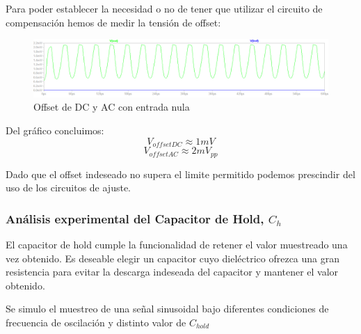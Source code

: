 Para poder establecer la necesidad o no de tener que utilizar el circuito de compensación hemos de medir la tensión de offset:
\begin{figure}[H]
	\centering
	\includegraphics[width=\linewidth]{ImagenesEjercicio4/DCACoffset}
	\caption{Offset de DC y AC con entrada nula}
	\label{fig:dcacoffset}
\end{figure}
Del gráfico concluimos:
$$V_{offset DC}\approx 1mV$$
$$V_{offset AC}\approx 2mV_{pp}$$

Dado que el offset indeseado no supera el limite permitido podemos prescindir del uso de los circuitos de ajuste.

\subsubsection{Análisis experimental del Capacitor de Hold, $C_{h}$}
El capacitor de hold cumple la funcionalidad de retener el valor muestreado una vez obtenido. Es deseable elegir un capacitor cuyo dieléctrico ofrezca una gran resistencia para evitar la descarga indeseada del capacitor y mantener el valor obtenido.

Se simulo el muestreo de una señal sinusoidal bajo diferentes condiciones de frecuencia de oscilación y distinto valor de $C_{hold}$

